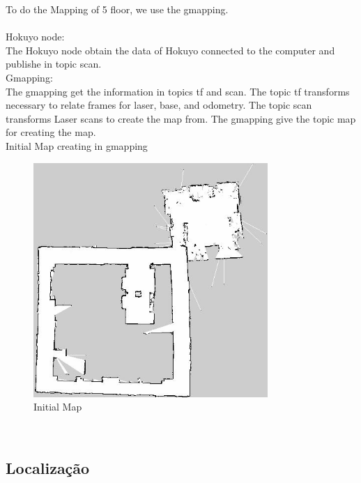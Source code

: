 \documentclass[journal]{IEEEtran}
\begin{document}
	To do the Mapping of 5 floor, we use the gmapping.
	\\
	\\
	Hokuyo node:
	\\
	The Hokuyo node obtain the data of Hokuyo connected to the computer and
	publishe in topic scan.
	\\

	Gmapping:
	\\
	The gmapping get the information in topics tf and scan. The topic tf transforms necessary to relate frames for laser, base, and odometry. The topic scan transforms Laser scans to create the map from.
	The gmapping give the topic map for creating the map.
	\\


	Initial Map creating in gmapping
	\begin{figure}[ht]
	\centering
	\includegraphics[width=21pc]{map.jpeg}
	\caption{Initial Map}
	\label{fig_env}
	\end{figure}
	\\

\subsection{Localização}

%
%
\end{document}
